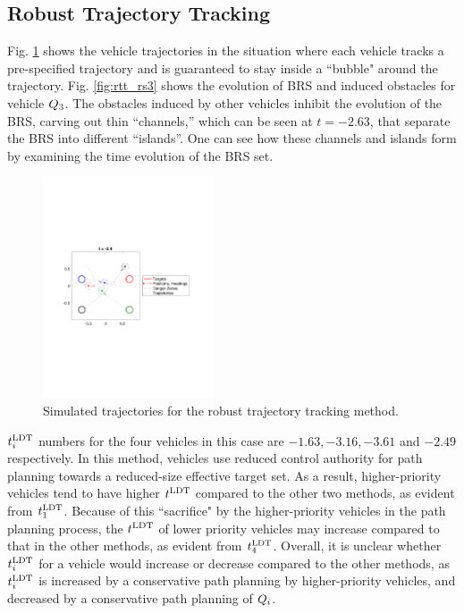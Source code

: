 \subsection{Robust Trajectory Tracking}
Fig. \ref{fig:rtt_traj} shows the vehicle trajectories in the situation where each vehicle tracks a pre-specified trajectory and is guaranteed to stay inside a ``bubble" around the trajectory. Fig. \ref{fig:rtt_rs3} shows the evolution of BRS and induced obstacles for vehicle $Q_3$. The obstacles induced by other vehicles inhibit the evolution of the BRS, carving out thin “channels,” which can be seen at $t = -2.63$, that separate the BRS into different “islands”. One can see how these channels and islands form by examining the time evolution of the BRS set.

\begin{figure}
  \centering
  \includegraphics[width=0.45\textwidth]{"fig/rtt_traj"}
  \caption{Simulated trajectories for the robust trajectory tracking method.}
  \label{fig:rtt_traj}
\end{figure}

$t^\text{LDT}_i$ numbers for the four vehicles in this case are $-1.63, -3.16, -3.61$ and $-2.49$ respectively. In this method, vehicles use reduced control authority for path planning towards a reduced-size effective target set. As a result, higher-priority vehicles tend to have higher $t^\text{LDT}$ compared to the other two methods, as evident from $t^\text{LDT}_1$. Because of this ``sacrifice" by the higher-priority vehicles in the path planning process, the $t^\text{LDT}$ of lower priority vehicles may increase compared to that in the other methods, as evident from $t^\text{LDT}_4$. Overall, it is unclear whether $t^\text{LDT}_i$ for a vehicle would increase or decrease compared to the other methods, as $t^\text{LDT}_i$ is increased by a conservative path planning by higher-priority vehicles, and decreased by a conservative path planning of $Q_i$. 

